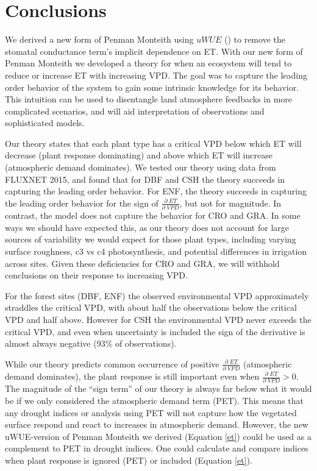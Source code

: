 \documentclass[draft,linenumbers]{agujournal}
\begin{document}
\section{Conclusions} 

We derived a new form of Penman Monteith using $uWUE$ (\cite{Zhou_2015}) to remove the stomatal conductance term's implicit dependence on ET. With our new form of Penman Monteith we developed a theory for when an ecosystem will tend to reduce or increase ET with increasing VPD. The goal was to capture the leading order behavior of the system to gain some intrinsic knowledge for its behavior. This intuition can be used to disentangle land atmosphere feedbacks in more complicated scenarios, and will aid interpretation of observations and sophisticated models.

Our theory states that each plant type has a critical VPD below which ET will decrease (plant response dominating) and above which ET will increase (atmospheric demand dominates). We tested our theory using data from FLUXNET 2015, and found that for DBF and CSH the theory succeeds in capturing the leading order behavior. For ENF, the theory succeeds in capturing the leading order behavior for the sign of $\frac{\partial \; ET}{\partial \; VPD}$, but not for magnitude. In contrast, the model does not capture the behavior for CRO and GRA. In some ways we should have expected this, as our theory does not account for large sources of variability we would expect for those plant types, including varying surface roughness, c3 vs c4 photosynthesis, and potential differences in irrigation across sites. Given these deficiencies for CRO and GRA, we will withhold conclusions on their response to increasing VPD.

For the forest sites (DBF, ENF) the observed environmental VPD approximately straddles the critical VPD, with about half the observations below the critical VPD and half above. However for CSH the environmental VPD never exceeds the critical VPD, and even when uncertainty is included the sign of the derivative is almost always negative (93\% of observations).

While our theory predicts common occurrence of positive $\frac{\partial \; ET}{\partial \; VPD}$ (atmospheric demand dominates), the plant response is still important even when $\frac{\partial \; ET}{\partial \; VPD} > 0$. The magnitude of the ``sign term'' of our theory is always far below what it would be if we only considered the atmospheric demand term (PET). This means that any drought indices or analysis using PET will not capture how the vegetated surface respond and react to increases in atmospheric demand. However, the new uWUE-version of Penman Monteith we derived (Equation \ref{et}) could be used as a complement to PET in drought indices. One could calculate and compare indices  when plant response is ignored (PET) or included (Equation \ref{et}). 
\end{document}
